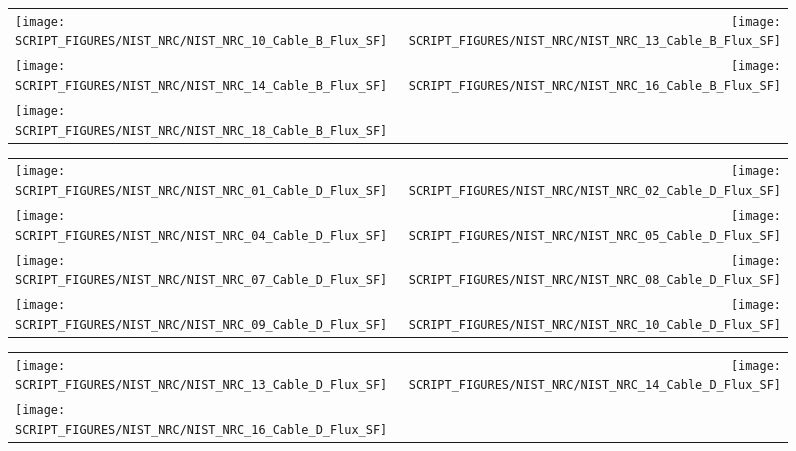 \begin{figure}[p]
\begin{tabular*}{\textwidth}{l@{\extracolsep{\fill}}r}
\texttt{[image: SCRIPT\_FIGURES/NIST\_NRC/NIST\_NRC\_10\_Cable\_B\_Flux\_SF]} &
\texttt{[image: SCRIPT\_FIGURES/NIST\_NRC/NIST\_NRC\_13\_Cable\_B\_Flux\_SF]} \\
\texttt{[image: SCRIPT\_FIGURES/NIST\_NRC/NIST\_NRC\_14\_Cable\_B\_Flux\_SF]} &
\texttt{[image: SCRIPT\_FIGURES/NIST\_NRC/NIST\_NRC\_16\_Cable\_B\_Flux\_SF]} \\
\texttt{[image: SCRIPT\_FIGURES/NIST\_NRC/NIST\_NRC\_18\_Cable\_B\_Flux\_SF]}
\end{tabular*}
\end{figure}

\begin{figure}[p]
\begin{tabular*}{\textwidth}{l@{\extracolsep{\fill}}r}
\texttt{[image: SCRIPT\_FIGURES/NIST\_NRC/NIST\_NRC\_01\_Cable\_D\_Flux\_SF]} &
\texttt{[image: SCRIPT\_FIGURES/NIST\_NRC/NIST\_NRC\_02\_Cable\_D\_Flux\_SF]} \\
\texttt{[image: SCRIPT\_FIGURES/NIST\_NRC/NIST\_NRC\_04\_Cable\_D\_Flux\_SF]} &
\texttt{[image: SCRIPT\_FIGURES/NIST\_NRC/NIST\_NRC\_05\_Cable\_D\_Flux\_SF]} \\
\texttt{[image: SCRIPT\_FIGURES/NIST\_NRC/NIST\_NRC\_07\_Cable\_D\_Flux\_SF]} &
\texttt{[image: SCRIPT\_FIGURES/NIST\_NRC/NIST\_NRC\_08\_Cable\_D\_Flux\_SF]} \\
\texttt{[image: SCRIPT\_FIGURES/NIST\_NRC/NIST\_NRC\_09\_Cable\_D\_Flux\_SF]} &
\texttt{[image: SCRIPT\_FIGURES/NIST\_NRC/NIST\_NRC\_10\_Cable\_D\_Flux\_SF]}
\end{tabular*}
\end{figure}

\begin{figure}[p]
\begin{tabular*}{\textwidth}{l@{\extracolsep{\fill}}r}
\texttt{[image: SCRIPT\_FIGURES/NIST\_NRC/NIST\_NRC\_13\_Cable\_D\_Flux\_SF]} &
\texttt{[image: SCRIPT\_FIGURES/NIST\_NRC/NIST\_NRC\_14\_Cable\_D\_Flux\_SF]} \\
\texttt{[image: SCRIPT\_FIGURES/NIST\_NRC/NIST\_NRC\_16\_Cable\_D\_Flux\_SF]}
\end{tabular*}
\end{figure}

